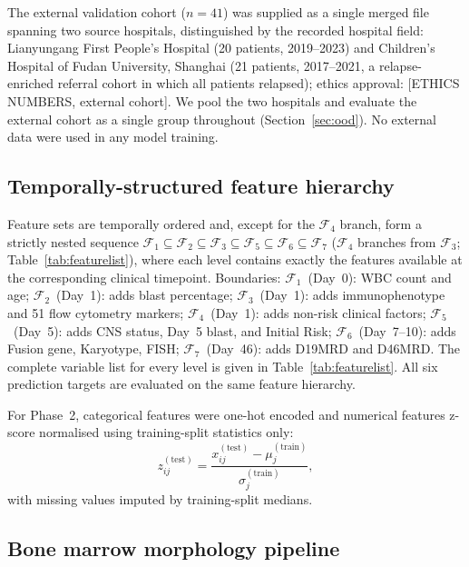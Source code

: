 \documentclass[pdflatex,sn-nature]{sn-jnl}
\begin{document}
The external validation cohort ($n=41$) was supplied as a single
merged file spanning two source hospitals, distinguished by the
recorded hospital field: Lianyungang First People's Hospital (20
patients, 2019--2023) and Children's Hospital of Fudan University,
Shanghai (21 patients, 2017--2021, a relapse-enriched referral cohort
in which all patients relapsed); ethics approval: [ETHICS NUMBERS,
external cohort]. We pool the two hospitals and evaluate the external
cohort as a single group throughout (Section~\ref{sec:ood}).
No external data were used in any model training.

\subsection{Temporally-structured feature hierarchy}\label{sec:features}

Feature sets are temporally ordered and, except for the
$\mathcal{F}_4$ branch, form a strictly nested sequence
$\mathcal{F}_1 \subseteq \mathcal{F}_2 \subseteq \mathcal{F}_3
\subseteq \mathcal{F}_5 \subseteq \mathcal{F}_6 \subseteq \mathcal{F}_{7}$
($\mathcal{F}_4$ branches from $\mathcal{F}_3$; Table~\ref{tab:featurelist}),
where each level contains exactly the features available at the
corresponding clinical timepoint.
Boundaries: $\mathcal{F}_1$~(Day~0): WBC count and age;
$\mathcal{F}_2$~(Day~1): adds blast percentage;
$\mathcal{F}_3$~(Day~1): adds immunophenotype and 51 flow cytometry markers;
$\mathcal{F}_4$~(Day~1): adds non-risk clinical factors;
$\mathcal{F}_5$~(Day~5): adds CNS status, Day~5 blast, and Initial Risk;
$\mathcal{F}_6$~(Day~7--10): adds Fusion gene, Karyotype, FISH;
$\mathcal{F}_7$~(Day~46): adds D19MRD and D46MRD.
The complete variable list for every level is given in
Table~\ref{tab:featurelist}.
All six prediction targets are evaluated on the same feature hierarchy.

For Phase~2, categorical features were one-hot encoded and numerical
features z-score normalised using training-split statistics only:
\begin{equation}
z_{ij}^{(\text{test})} =
\frac{x_{ij}^{(\text{test})} - \mu_j^{(\text{train})}}
     {\sigma_j^{(\text{train})}},
\label{eq:zscore}
\end{equation}
with missing values imputed by training-split medians.

\subsection{Bone marrow morphology pipeline}\label{sec:morph}
\end{document}
